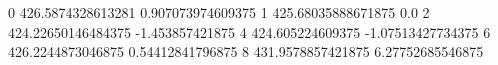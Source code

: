 0 426.5874328613281 0.907073974609375
1 425.68035888671875 0.0
2 424.22650146484375 -1.453857421875
4 424.605224609375 -1.07513427734375
6 426.2244873046875 0.54412841796875
8 431.9578857421875 6.27752685546875
